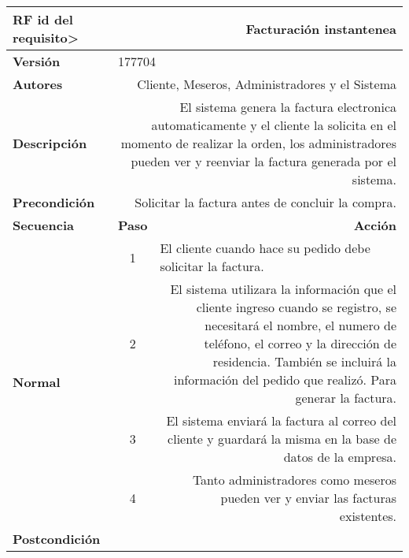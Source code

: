 \documentclass[conference]{IEEEtran}
\begin{document}
\begin{table}[H]
  \centering
  \begin{adjustbox}{width=0.47\textwidth}
    \begin{tabular}{|p{11.215em}|r|r|}
    \toprule
    \textbf{RF id del requisito>} & \multicolumn{2}{p{37.355em}|}{\textbf{Facturación instantenea}} \\
    \midrule
    \textbf{Versión} & \multicolumn{2}{l|}{177704} \\
    \midrule
    \textbf{Autores} & \multicolumn{2}{p{37.355em}|}{Cliente, Meseros, Administradores y el Sistema} \\
    \midrule
    \textbf{Descripción} & \multicolumn{2}{p{37.355em}|}{El sistema genera la factura electronica automaticamente y el cliente la solicita en el momento de realizar la orden, los administradores pueden ver y reenviar la factura generada por el sistema.} \\
    \midrule
    \textbf{Precondición} & \multicolumn{2}{p{37.355em}|}{Solicitar la factura antes de concluir la compra.} \\
    \midrule
    \textbf{Secuencia} & \multicolumn{1}{p{5.355em}|}{\textbf{Paso}} & \multicolumn{1}{p{32em}|}{\textbf{Acción}} \\
    \midrule
    \multirow{5}[8]{*}{\textbf{Normal}} & \multicolumn{1}{c|}{\multirow{2}[2]{*}{1}} & \multicolumn{1}{l|}{\multirow{2}[2]{*}{El cliente cuando hace su pedido debe solicitar la factura.}} \\
    \multicolumn{1}{|c|}{} & \multicolumn{1}{c|}{} &  \\
\cmidrule{2-3}    \multicolumn{1}{|c|}{} & \multicolumn{1}{c|}{2} & \multicolumn{1}{p{32em}|}{El sistema utilizara la información que el cliente ingreso cuando se registro, se necesitará el nombre, el numero de teléfono, el correo y la dirección de residencia. También se incluirá la información del pedido que realizó. Para generar la factura.} \\
\cmidrule{2-3}    \multicolumn{1}{|c|}{} & \multicolumn{1}{c|}{3} & \multicolumn{1}{p{32em}|}{El sistema enviará la factura al correo del cliente y guardará la misma en la base de datos de la empresa.} \\
\cmidrule{2-3}    \multicolumn{1}{|c|}{} & \multicolumn{1}{c|}{4} & \multicolumn{1}{p{32em}|}{Tanto administradores como meseros pueden ver y enviar las facturas existentes.} \\
    \midrule
    \textbf{Postcondición} & \multicolumn{2}{r|}{} \\

\end{tabular}
\end{adjustbox}
\end{table}
\end{document}
